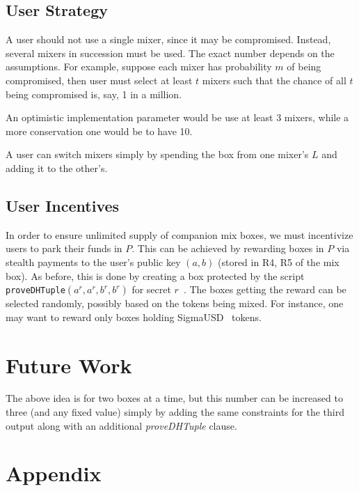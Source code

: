 \documentclass[runningheads]{llncs}
\begin{document}
\subsection{User Strategy}

A user should not use a single mixer, since it may be compromised. Instead, several mixers in succession must be used.
The exact number depends on the assumptions.
For example, suppose each mixer has probability $m$ of being compromised, then user must select at least $t$ mixers such that the chance of all
$t$ being compromised is, say, 1 in a million.

An optimistic implementation parameter would be use at least 3 mixers, while a more conservation one would be to have 10.

A user can switch mixers simply by spending the box from one mixer's $L$ and adding it to the other's.

\subsection{User Incentives}

In order to ensure unlimited supply of companion mix boxes, we must incentivize users to park their funds in $P$.
This can be achieved by rewarding boxes in $P$ via stealth payments to the user's public key $(a, b)$ (stored in R4, R5 of the mix box). As before,
this is done by creating a box protected by the script \texttt{proveDHTuple}$(a^r, a^r, b^r, b^r)$ for secret $r$~\cite{stealth-payments}.
The boxes getting the reward can be selected randomly, possibly based on the tokens being mixed. For instance, one may want to reward only boxes holding SigmaUSD~\cite{sigma-usd} tokens.

\section{Future Work}

The above idea is for two boxes at a time, but this number can be increased to three (and any fixed value) simply by adding the same constraints for the third output along with an additional {\em proveDHTuple} clause.




\appendix

\section*{Appendix}
\end{document}
